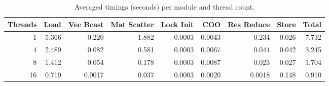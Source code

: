 \documentclass[11pt]{article}
\begin{document}
\begin{table}[t]
  \centering
  \caption{Averaged timings (seconds) per module and thread count.}
  \label{tab:summary}
  \begin{tabular}{rrrrrrrrr}
    \toprule
    Threads & Load & Vec Bcast & Mat Scatter & Lock Init & COO & Res Reduce & Store & Total \\
    \midrule
    1  & 5.366 & 0.220 & 1.882 & 0.0003 & 0.0043 & 0.234 & 0.026 & 7.732 \\
    4  & 2.489 & 0.082 & 0.581 & 0.0003 & 0.0067 & 0.044 & 0.042 & 3.245 \\
    8  & 1.412 & 0.054 & 0.178 & 0.0003 & 0.0087 & 0.023 & 0.027 & 1.704 \\
    16 & 0.719 & 0.0017 & 0.037 & 0.0003 & 0.0020 & 0.0018 & 0.148 & 0.910 \\
    \bottomrule
  \end{tabular}
\end{table}
\end{document}
